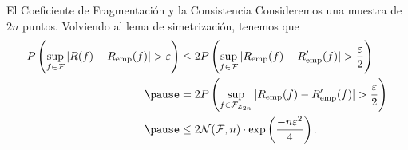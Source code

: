 \documentclass[aspectratio=169, 10pt]{beamer}
\begin{document}
\begin{frame}{El Coeficiente de Fragmentación y la Consistencia}
Consideremos una muestra de \(2n\) puntos. Volviendo al lema de simetrización, tenemos que
\[
\begin{aligned}
P\left(\sup_{f \in \mathcal{F}} |R(f) - R_{\text{emp}}(f)| > \varepsilon\right) &\leq
2P\left(\sup_{f \in \mathcal{F}} |R_{\text{emp}}(f) - R'_{\text{emp}}(f)| > \frac{\varepsilon}{2}\right)\\
\pause& = 2P\left(\sup_{f \in \mathcal{F}_{Z_{2n}}} |R_{\text{emp}}(f) - R'_{\text{emp}}(f)| > \frac{\varepsilon}{2}\right)\\
\pause& \leq 2  \mathcal{N}(\mathcal{F}, n)\cdot \exp\left(\frac{-n\varepsilon^2}{4}\right).
\end{aligned}
\]
\end{frame}







\end{document}
